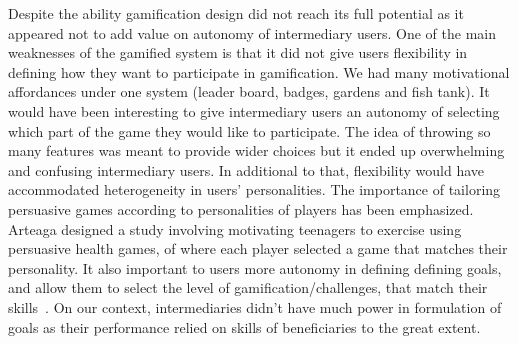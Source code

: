\documentclass{sig-alternate}
\begin{document}
Despite the ability  gamification design did not reach its full potential as it appeared not to add value on autonomy of intermediary users. One of the main weaknesses of the gamified system is that it did not give users flexibility in defining how they want to participate in gamification. We had many motivational affordances under one system (leader board, badges, gardens and fish tank). It would have been interesting to give intermediary users an autonomy of selecting which part of the game they would like to participate. The idea of throwing so many features was meant to provide wider choices but it ended up overwhelming and confusing intermediary users. In additional to that, flexibility would have accommodated heterogeneity in users' personalities. The importance of tailoring persuasive games according to personalities of players has been emphasized\cite{orji2013:tailoring}. Arteaga \cite{arteaga2010:persuasive} designed a study involving motivating teenagers to exercise using persuasive health games, of where each player selected a game that matches their personality. It also important to users more autonomy in defining defining goals, and allow them to select the level of gamification/challenges, that match their skills~\cite{zhang2008:motivational}. On our context, intermediaries didn't have much power in formulation of goals as their performance relied on skills of beneficiaries to the great extent. 
\end{document}
